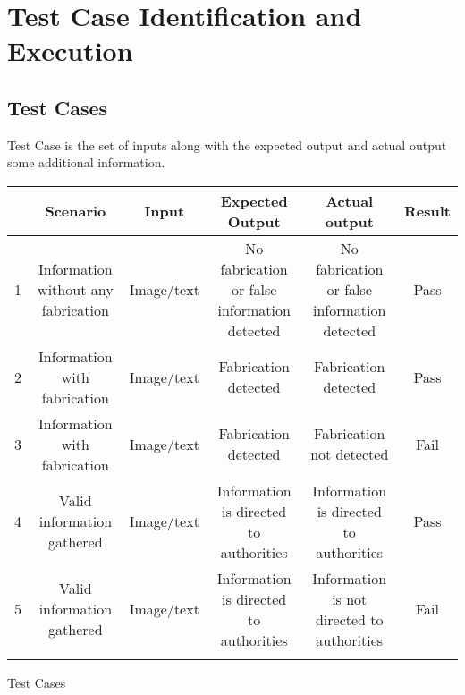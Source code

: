 \section{Test Case Identification and Execution}
\subsection{Test Cases}
Test Case is the set of inputs along with the expected output and actual output some
additional information.


\begin{center}
     \begin{tabular}{c|c|c|c|c|c|}
         
         \begin{tabularx}{1\textwidth} { 
  | >{\raggedright\arraybackslash}X 
  | >{\raggedright\arraybackslash}X
  | >{\raggedright\arraybackslash}X 
  | >{\raggedright\arraybackslash}X
  | >{\raggedright\arraybackslash}X
  | >{\raggedright\arraybackslash}X|}
 \hline
  ID & Scenario & Input & Expected Output & Actual output & Result\\
 \hline
 1&Information without any fabrication &Image/text&No fabrication or false information detected&No fabrication or false information detected& Pass\\
\hline
  2&Information with fabrication  &Image/text&Fabrication detected
&Fabrication detected&Pass\\
\hline
 3&Information with fabrication & Image/text & Fabrication detected &Fabrication not detected&Fail \\
\hline
  4&Valid information gathered& Image/text & Information is directed to authorities &Information is directed to authorities &Pass \\
\hline
 5&Valid information gathered & Image/text & Information is directed to authorities&Information is not directed to authorities & Fail
 \\
\hline
\end{tabularx} 
     \end{tabular}
     \caption{Test Cases }
    \label{tab:my_label}
 \end{center}


 
    
